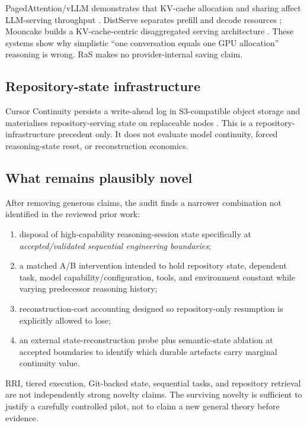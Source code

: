 PagedAttention/vLLM demonstrates that KV-cache allocation and sharing affect LLM-serving throughput \citep{kwon2023vllm}. DistServe separates prefill and decode resources \citep{zhong2024distserve}; Mooncake builds a KV-cache-centric disaggregated serving architecture \citep{qin2024mooncake}. These systems show why simplistic “one conversation equals one GPU allocation” reasoning is wrong. RaS makes no provider-internal saving claim.

\subsection{Repository-state infrastructure}

Cursor Continuity persists a write-ahead log in S3-compatible object storage and materialises repository-serving state on replaceable nodes \citep{marti2026continuity}. This is a repository-infrastructure precedent only. It does not evaluate model continuity, forced reasoning-state reset, or reconstruction economics.

\subsection{What remains plausibly novel}

After removing generous claims, the audit finds a narrower combination not identified in the reviewed prior work:

\begin{enumerate}
    \item disposal of high-capability reasoning-session state specifically at \emph{accepted/validated sequential engineering boundaries};
    \item a matched A/B intervention intended to hold repository state, dependent task, model capability/configuration, tools, and environment constant while varying predecessor reasoning history;
    \item reconstruction-cost accounting designed so repository-only resumption is explicitly allowed to lose;
    \item an external state-reconstruction probe plus semantic-state ablation at accepted boundaries to identify which durable artefacts carry marginal continuity value.
\end{enumerate}

RRI, tiered execution, Git-backed state, sequential tasks, and repository retrieval are not independently strong novelty claims. The surviving novelty is sufficient to justify a carefully controlled pilot, not to claim a new general theory before evidence.
